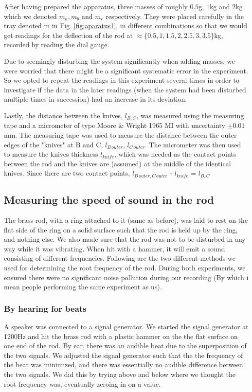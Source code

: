 \documentclass[11pt,a4paper]{article}
\begin{document}
    After having prepared the apparatus, three masses of roughly $0.5$g, $1$kg and $2$kg which we denoted $m_a, m_b$ and $m_c$ respectively. They were placed carefully in the tray denoted m in Fig. \ref{fig:aparatus1}, in different combinations so that we would get readings for the deflection of the rod at $\approx \{0.5, 1, 1.5, 2, 2.5, 3, 3.5\}$kg, recorded by reading the dial gauge.

    Due to seemingly disturbing the system significantly when adding masses, we were worried that there might be a significant systematic error in the experiment. So we opted to repeat the readings in this experiment several times in order to investigate if the data in the later readings (when the system had been disturbed multiple times in succession) had an increase in its deviation.

    Lastly, the distance between the knives, $l_{B, C}$, was measured using the measuring tape and a micrometer of type Moore \& Wright 1965 MI with uncertainty $\pm0.01$mm. The measuring tape was used to measure the distance between the outer edges of the "knives" at B and C, $l_{B\, outer}$, $l_{C\, outer}$. The micrometer was then used to measure the knives thickness $l_{knife}$, which was needed as the contact points between the rod and the knives are (assumed) at the middle of the identical knives. Since there are two contact points, $l_{B\,outer, C\, outer}$ - $l_{knife}$ = $l_{B, C}$
    
  \subsection{Measuring the speed of sound in the rod}
      The brass rod, with a ring attached to it (same as before), was laid to rest on the flat side of the ring on a solid surface such that the rod is held up by the ring, and nothing else. We also made sure that the rod was not to be disturbed in any way while it was vibrating. When hit with a hammer, it will emit a sound consisting of different frequencies. Following are the two different methods we used for determining the root frequency of the rod.
      During both experiments, we ensured there were no significant noise pollution during our recording (By which i mean people performing the same experiment as us).
      \subsubsection{By hearing for beats}
        A speaker was connected to a signal generator. We started the signal generator at 1200Hz and hit the brass rod with a plastic hammer on the the flat surface on one end of the rod. By ear, there was an audible beat due to the superposition of the two signals. We adjusted the signal generator such that the the frequency of the beat was minimized, and there was essentially no audible difference between the two signals. We did this by trying above and below where we thought the root frequency was, eventually zeroing in on a value.
\end{document}

